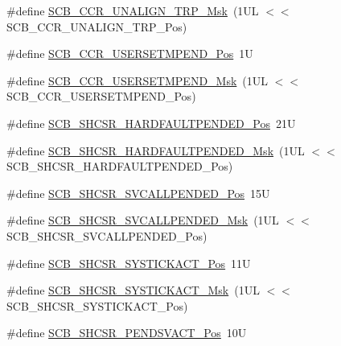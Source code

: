 \begin{DoxyCompactItemize}
\item 
\#define \mbox{\hyperlink{group___c_m_s_i_s___s_c_b_ga68c96ad594af70c007923979085c99e0}{S\+C\+B\+\_\+\+C\+C\+R\+\_\+\+U\+N\+A\+L\+I\+G\+N\+\_\+\+T\+R\+P\+\_\+\+Msk}}~(1\+U\+L $<$$<$ S\+C\+B\+\_\+\+C\+C\+R\+\_\+\+U\+N\+A\+L\+I\+G\+N\+\_\+\+T\+R\+P\+\_\+\+Pos)
\item 
\#define \mbox{\hyperlink{group___c_m_s_i_s___s_c_b_ga789e41f45f59a8cd455fd59fa7652e5e}{S\+C\+B\+\_\+\+C\+C\+R\+\_\+\+U\+S\+E\+R\+S\+E\+T\+M\+P\+E\+N\+D\+\_\+\+Pos}}~1U
\item 
\#define \mbox{\hyperlink{group___c_m_s_i_s___s_c_b_ga4cf59b6343ca962c80e1885710da90aa}{S\+C\+B\+\_\+\+C\+C\+R\+\_\+\+U\+S\+E\+R\+S\+E\+T\+M\+P\+E\+N\+D\+\_\+\+Msk}}~(1\+U\+L $<$$<$ S\+C\+B\+\_\+\+C\+C\+R\+\_\+\+U\+S\+E\+R\+S\+E\+T\+M\+P\+E\+N\+D\+\_\+\+Pos)
\item 
\#define \mbox{\hyperlink{group___c_m_s_i_s___s_c_b_ga2e86fa5b7279235de3a62839e3f147cb}{S\+C\+B\+\_\+\+S\+H\+C\+S\+R\+\_\+\+H\+A\+R\+D\+F\+A\+U\+L\+T\+P\+E\+N\+D\+E\+D\+\_\+\+Pos}}~21U
\item 
\#define \mbox{\hyperlink{group___c_m_s_i_s___s_c_b_gad72747c81f58f73f0610760529697297}{S\+C\+B\+\_\+\+S\+H\+C\+S\+R\+\_\+\+H\+A\+R\+D\+F\+A\+U\+L\+T\+P\+E\+N\+D\+E\+D\+\_\+\+Msk}}~(1\+U\+L $<$$<$ S\+C\+B\+\_\+\+S\+H\+C\+S\+R\+\_\+\+H\+A\+R\+D\+F\+A\+U\+L\+T\+P\+E\+N\+D\+E\+D\+\_\+\+Pos)
\item 
\#define \mbox{\hyperlink{group___c_m_s_i_s___s_c_b_ga2f93ec9b243f94cdd3e94b8f0bf43641}{S\+C\+B\+\_\+\+S\+H\+C\+S\+R\+\_\+\+S\+V\+C\+A\+L\+L\+P\+E\+N\+D\+E\+D\+\_\+\+Pos}}~15U
\item 
\#define \mbox{\hyperlink{group___c_m_s_i_s___s_c_b_ga6095a7acfbad66f52822b1392be88652}{S\+C\+B\+\_\+\+S\+H\+C\+S\+R\+\_\+\+S\+V\+C\+A\+L\+L\+P\+E\+N\+D\+E\+D\+\_\+\+Msk}}~(1\+U\+L $<$$<$ S\+C\+B\+\_\+\+S\+H\+C\+S\+R\+\_\+\+S\+V\+C\+A\+L\+L\+P\+E\+N\+D\+E\+D\+\_\+\+Pos)
\item 
\#define \mbox{\hyperlink{group___c_m_s_i_s___s_c_b_gaec9ca3b1213c49e2442373445e1697de}{S\+C\+B\+\_\+\+S\+H\+C\+S\+R\+\_\+\+S\+Y\+S\+T\+I\+C\+K\+A\+C\+T\+\_\+\+Pos}}~11U
\item 
\#define \mbox{\hyperlink{group___c_m_s_i_s___s_c_b_gafef530088dc6d6bfc9f1893d52853684}{S\+C\+B\+\_\+\+S\+H\+C\+S\+R\+\_\+\+S\+Y\+S\+T\+I\+C\+K\+A\+C\+T\+\_\+\+Msk}}~(1\+U\+L $<$$<$ S\+C\+B\+\_\+\+S\+H\+C\+S\+R\+\_\+\+S\+Y\+S\+T\+I\+C\+K\+A\+C\+T\+\_\+\+Pos)
\item 
\#define \mbox{\hyperlink{group___c_m_s_i_s___s_c_b_ga9b9fa69ce4c5ce7fe0861dbccfb15939}{S\+C\+B\+\_\+\+S\+H\+C\+S\+R\+\_\+\+P\+E\+N\+D\+S\+V\+A\+C\+T\+\_\+\+Pos}}~10U
$$
\end{DoxyCompactItemize}

